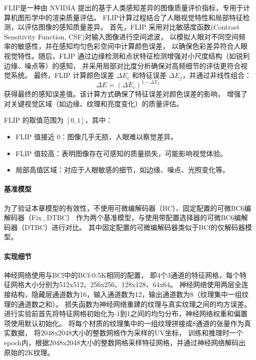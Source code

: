 FLIP是一种由 NVIDIA 提出的基于人类感知差异的图像质量评价指标，专用于计算机图形学中的渲染质量评估。
FLIP计算过程结合了人眼视觉特性和局部特征检测，以评估图像的感知质量差异。
首先，FLIP 采用对比敏感度函数(Contrast Sensitivity Function, CSF)对输入图像进行空间滤波，
以模拟人眼对不同空间频率的敏感性，并在感知均匀色彩空间中计算颜色误差，
以确保色彩差异符合人眼视觉特性。随后，FLIP 通过边缘检测和点状特征检测增强对小尺度结构（如锐利边缘、噪点等）的感知，
并采用局部对比度分析确保对高频细节的评估更符合视觉系统。
最终，FLIP 计算颜色误差 $\Delta E_c$ 和特征误差 $\Delta E_f$，并通过非线性组合：
\begin{equation}
    \Delta E = (\Delta E_c)^{1 - \Delta E_f}
\end{equation}
获得最终的感知误差值。该计算方式确保了特征误差对颜色误差的影响，
增强了对关键视觉区域（如边缘、纹理和亮度变化）的质量评估。

FLIP 的取值范围为 $[0,1]$，其中：
\begin{itemize}
    \item FLIP 值接近 0：图像几乎无损，人眼难以察觉差异。
    \item FLIP 值较高：表明图像存在可感知的质量损失，可能影响视觉体验。
    \item 局部高值区域：对应于人眼敏感的细节，如边缘、噪点、光照变化等。
\end{itemize}

\paragraph{基准模型}

为了验证本章模型的有效性，不使用可微编解码器（BC）、固定配置的可微BC6编解码器（Fix\_DTBC）
作为两个基准模型，与使用带配置选择器的可微BC6编解码器（DTBC）进行对比。
其中固定配置的可微编解码器类似于BCf\cite{weinreich2024real}的仅解码器模型。

\paragraph{实现细节}

神经网络使用与BCf\cite{weinreich2024real}中的BCf-0.5K相同的配置，
即4个3通道的特征网格，每个特征网格大小分别为512x512、256x256、128x128、64x64。
神经网络使用两层全连接结构，隐藏层通道数为16，输入通道数为12，输出通道数为8（纹理集中一组纹理的通道数之和）。
损失函数为神经网络重建的纹理与真实纹理之间的均方误差。
进行实验前首先将特征网格初始化为-1到1之间的均匀分布，神经网络权重和偏置项使用默认初始化。
将每个材质的纹理集中的一组纹理拼接成8通道的张量作为真实数据，
将2048x2048大小的整数网格作为采样的UV坐标，
训练和推理时一个epoch内，根据2048x2048大小的整数网格采样特征网格，并通过神经网络解码出原始的2K纹理。

